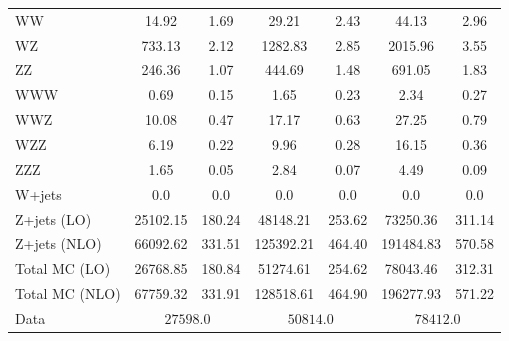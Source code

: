\begin{table}[p]
\begin{tabular}{l S[table-format=5.4] @{${}\pm{}$} S[table-format=3.3] S[table-format=5.4] @{${}\pm{}$} S[table-format=3.3] S[table-format=5.3] @{${}\pm{}$} S[table-format=3.2]}
WW & 14.92 & 1.69 & 29.21 & 2.43 & 44.13 & 2.96    \\
WZ & 733.13 & 2.12 & 1282.83 & 2.85 & 2015.96 & 3.55    \\
ZZ & 246.36 & 1.07 & 444.69 & 1.48 & 691.05 & 1.83    \\
WWW & 0.69 & 0.15 & 1.65 & 0.23 & 2.34 & 0.27    \\
WWZ & 10.08 & 0.47 & 17.17 & 0.63 & 27.25 & 0.79    \\
WZZ & 6.19 & 0.22 & 9.96 & 0.28 & 16.15 & 0.36    \\
ZZZ & 1.65 & 0.05 & 2.84 & 0.07 & 4.49 & 0.09    \\
W+jets & 0.0 & 0.0 & 0.0 & 0.0 & 0.0 & 0.0    \\
\hline
Z+jets (LO) & 25102.15 & 180.24 & 48148.21 & 253.62 & 73250.36 & 311.14    \\
Z+jets (NLO) & 66092.62 & 331.51 & 125392.21 & 464.40 & 191484.83 & 570.58    \\
\hline
Total MC (LO) & 26768.85 & 180.84 & 51274.61 & 254.62 & 78043.46 & 312.31   \\
Total MC (NLO) & 67759.32 & 331.91 & 128518.61 & 464.90 & 196277.93 & 571.22    \\
\hline
Data &  &  &     \\
\hline
\end{tabular}
\end{table}


